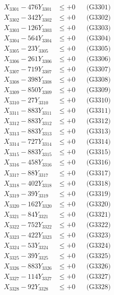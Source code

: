 \documentclass[a4paper,10pt]{article}
\begin{document}
{\begin{align}
\allowbreak
X_{3301} - 476Y_{3301} &\leq +0 && \text{(G3301)} \\
X_{3302} - 342Y_{3302} &\leq +0 && \text{(G3302)} \\
X_{3303} - 126Y_{3303} &\leq +0 && \text{(G3303)} \\
X_{3304} - 564Y_{3304} &\leq +0 && \text{(G3304)} \\
X_{3305} - 23Y_{3305} &\leq +0 && \text{(G3305)} \\
X_{3306} - 261Y_{3306} &\leq +0 && \text{(G3306)} \\
X_{3307} - 719Y_{3307} &\leq +0 && \text{(G3307)} \\
X_{3308} - 398Y_{3308} &\leq +0 && \text{(G3308)} \\
X_{3309} - 850Y_{3309} &\leq +0 && \text{(G3309)} \\
X_{3310} - 27Y_{3310} &\leq +0 && \text{(G3310)} \\
\allowbreak
X_{3311} - 883Y_{3311} &\leq +0 && \text{(G3311)} \\
X_{3312} - 883Y_{3312} &\leq +0 && \text{(G3312)} \\
X_{3313} - 883Y_{3313} &\leq +0 && \text{(G3313)} \\
X_{3314} - 727Y_{3314} &\leq +0 && \text{(G3314)} \\
X_{3315} - 883Y_{3315} &\leq +0 && \text{(G3315)} \\
X_{3316} - 458Y_{3316} &\leq +0 && \text{(G3316)} \\
X_{3317} - 88Y_{3317} &\leq +0 && \text{(G3317)} \\
X_{3318} - 402Y_{3318} &\leq +0 && \text{(G3318)} \\
X_{3319} - 39Y_{3319} &\leq +0 && \text{(G3319)} \\
X_{3320} - 162Y_{3320} &\leq +0 && \text{(G3320)} \\
\allowbreak
X_{3321} - 84Y_{3321} &\leq +0 && \text{(G3321)} \\
X_{3322} - 752Y_{3322} &\leq +0 && \text{(G3322)} \\
X_{3323} - 422Y_{3323} &\leq +0 && \text{(G3323)} \\
X_{3324} - 53Y_{3324} &\leq +0 && \text{(G3324)} \\
X_{3325} - 39Y_{3325} &\leq +0 && \text{(G3325)} \\
X_{3326} - 883Y_{3326} &\leq +0 && \text{(G3326)} \\
X_{3327} - 114Y_{3327} &\leq +0 && \text{(G3327)} \\
X_{3328} - 92Y_{3328} &\leq +0 && \text{(G3328)} \\

\end{align}}
\end{document}
